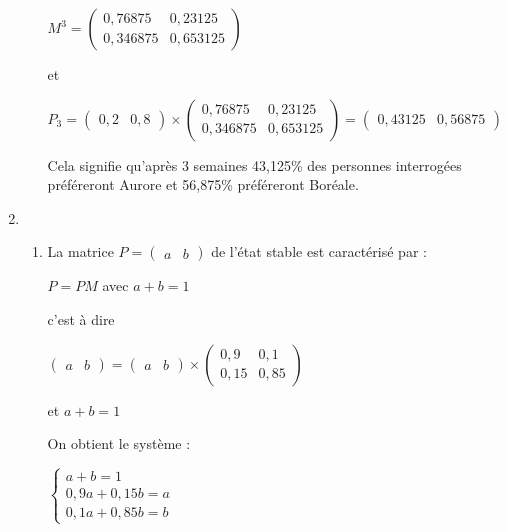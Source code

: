 \begin{corrige}
\begin{enumerate}
\begin{enumerate}[label=\alph*.]
               $M^{3}=\begin{pmatrix} 0,76875 & 0,23125  \\ 0,346875 & 0,653125 \end{pmatrix}$
               \par
               et
               \par
               $P_{3}=\begin{pmatrix}0,2 & 0,8\end{pmatrix}\times \begin{pmatrix} 0,76875 & 0,23125  \\ 0,346875 & 0,653125 \end{pmatrix}=\begin{pmatrix}0,43125 & 0,56875\end{pmatrix}$
               \par
               Cela signifie qu'après 3 semaines 43,125\% des personnes interrogées préféreront Aurore et 56,875\% préféreront Boréale.
          \end{enumerate}
          \item
          \begin{enumerate}[label=\alph*.]
               \item
               La matrice $P=\begin{pmatrix}a & b \end{pmatrix}$ de l'état stable  est caractérisé par :
               \par
               $P=PM$ avec $a+b=1$
               \par
               c'est à dire
               \par
               $\begin{pmatrix}a & b \end{pmatrix}=\begin{pmatrix}a & b \end{pmatrix}\times \begin{pmatrix} 0,9 & 0,1  \\ 0,15 & 0,85 \end{pmatrix}$
               \par
               et $a+b=1$
               \par
               On obtient le système :
               \par
               $\left\{ \begin{matrix} a+b=1 \\ 0,9a+0,15b=a \\ 0,1a+0,85b=b \end{matrix}\right.$

\end{enumerate}
\end{enumerate}
\end{corrige}
